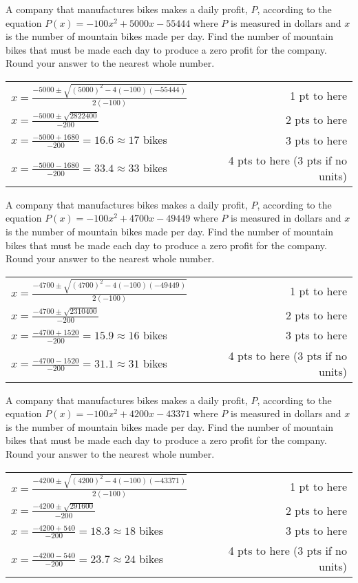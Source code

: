 {
	A company that manufactures bikes makes a daily profit, $P$, according to the equation $\displaystyle P(x)=-100x^2+5000x-55444$ where $P$ is measured in dollars and $x$ is the number of  mountain bikes made per day. Find the number of mountain bikes that must be made each day to produce a zero profit for the company. Round your answer to the nearest whole number.
}
{
	\begin{tabular}{l r}
	$x=\frac{-5000 \pm \sqrt{(5000)^2-4(-100)(-55444)}}{2(-100)}$ & 1 pt to here\\
	$x=\frac{-5000 \pm \sqrt{2822400}}{-200}$ &  2 pts to here\\
	$x=\frac{-5000+1680}{-200}=16.6 \approx 17$ bikes & 3 pts to here\\
	$x=\frac{-5000-1680}{-200}=33.4 \approx 33$ bikes & 4 pts to here (3 pts if no units)
	\end{tabular}
}

{
	A company that manufactures bikes makes a daily profit, $P$, according to the equation $\displaystyle P(x)=-100x^2+4700x-49449$ where $P$ is measured in dollars and $x$ is the number of  mountain bikes made per day. Find the number of mountain bikes that must be made each day to produce a zero profit for the company. Round your answer to the nearest whole number.
}
{
	\begin{tabular}{l r}
	$x=\frac{-4700 \pm \sqrt{(4700)^2-4(-100)(-49449)}}{2(-100)}$ & 1 pt to here\\
	$x=\frac{-4700 \pm \sqrt{2310400}}{-200}$ &  2 pts to here\\
	$x=\frac{-4700+1520}{-200}=15.9 \approx 16$ bikes & 3 pts to here\\
	$x=\frac{-4700-1520}{-200}=31.1 \approx 31$ bikes & 4 pts to here (3 pts if no units)
	\end{tabular}
}

{
	A company that manufactures bikes makes a daily profit, $P$, according to the equation $\displaystyle P(x)=-100x^2+4200x-43371$ where $P$ is measured in dollars and $x$ is the number of  mountain bikes made per day. Find the number of mountain bikes that must be made each day to produce a zero profit for the company. Round your answer to the nearest whole number.
}
{
	\begin{tabular}{l r}
	$x=\frac{-4200 \pm \sqrt{(4200)^2-4(-100)(-43371)}}{2(-100)}$ & 1 pt to here\\
	$x=\frac{-4200 \pm \sqrt{291600}}{-200}$ &  2 pts to here\\
	$x=\frac{-4200+540}{-200}=18.3 \approx 18$ bikes & 3 pts to here\\
	$x=\frac{-4200-540}{-200}=23.7 \approx 24$ bikes & 4 pts to here (3 pts if no units)
	\end{tabular}
}


